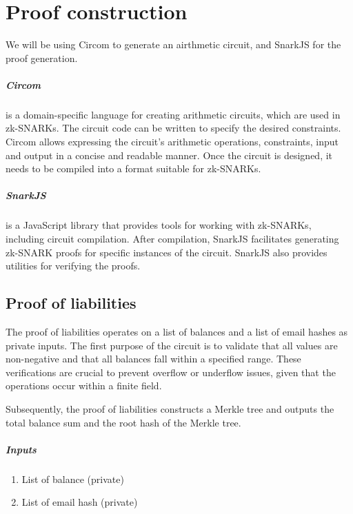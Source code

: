 
\chapter{Proof construction}
We will be using Circom to generate an airthmetic circuit, and SnarkJS for the proof generation.

\paragraph{Circom} is a domain-specific language for creating arithmetic circuits, which are used in zk-SNARKs.
The circuit code can be written to specify the desired constraints.
Circom allows expressing the circuit's arithmetic operations, constraints, input and output in a concise and readable manner.
Once the circuit is designed, it needs to be compiled into a format suitable for zk-SNARKs.


\paragraph{SnarkJS} is a JavaScript library that provides tools for working with zk-SNARKs, including circuit compilation.
After compilation, SnarkJS facilitates generating zk-SNARK proofs for specific instances of the circuit.
SnarkJS also provides utilities for verifying the proofs.

\section{Proof of liabilities}
\label{subsec:pl}
The proof of liabilities operates on a list of balances and a list of email hashes as private inputs.
The first purpose of the circuit is to validate that all values are non-negative and that all balances fall within a specified range. 
These verifications are crucial to prevent overflow or underflow issues, given that the operations occur within a finite field. 

Subsequently, the proof of liabilities constructs a Merkle tree and outputs the total balance sum and the root hash of the Merkle tree.

\paragraph{Inputs}
\begin{enumerate}

    \item List of balance (private)
    
    \item List of email hash (private)
    
    \end{enumerate}

